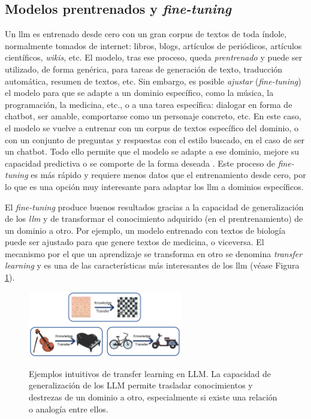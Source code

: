 \subsection{Modelos prentrenados y \emph{fine-tuning}} 
Un \gls{llm} es entrenado desde cero con un gran corpus de textos de toda índole, normalmente tomados de internet: libros, blogs, artículos de periódicos, artículos científicos, \emph{wikis}, etc. El modelo, tras ese proceso, queda \emph{prentrenado} \citep{hanPreTrainedModelsPresent2021} y puede ser utilizado, de forma genérica, para tareas de generación de texto, traducción automática, resumen de textos, etc. Sin embargo, es posible \emph{ajustar} (\emph\emph{fine-tuning}) el modelo para que se adapte a un dominio específico, como la música, la programación, la medicina, etc., o a una tarea específica: dialogar en forma de {chatbot}, ser amable, comportarse como un personaje concreto, etc. En este caso, el modelo se vuelve a entrenar con un corpus de textos específico del dominio, o con un conjunto de preguntas y respuestas con el estilo buscado, en el caso de ser un {chatbot}. Todo ello permite que el modelo se adapte a ese dominio, mejore su capacidad predictiva o se comporte de la forma deseada \citep{tianFinetuningLanguageModels2023}. Este proceso de \emph{fine-tuning} es más rápido y requiere menos datos que el entrenamiento desde cero, por lo que es una opción muy interesante para adaptar los \gls{llm} a dominios específicos.

El \emph{fine-tuning} produce buenos resultados gracias a la capacidad de generalización de los \emph{llm} y de transformar el conocimiento adquirido (en el prentrenamiento) de un dominio a otro. Por ejemplo, un modelo entrenado con textos de biología puede ser {ajustado} para que genere textos de medicina, o viceversa. El mecanismo por el que un aprendizaje se transforma en otro se denomina \emph{transfer learning} \citep{zhuangComprehensiveSurveyTransfer2020} y es una de las características más interesantes de los \gls{llm} (véase Figura \ref{fig:transfer_learning}).

\begin{figure}[H]
    \caption[Ejemplos intuitivos de {transfer learning} en LLM]{Ejemplos intuitivos de {transfer learning} en LLM. La capacidad de generalización de los LLM permite trasladar conocimientos y destrezas de un dominio a otro, especialmente si existe una relación o analogía entre ellos.}
    \centering
    \includegraphics[width=0.6\textwidth]{./figuras/transfer_learning.png}
    \label{fig:transfer_learning}
\end{figure}


